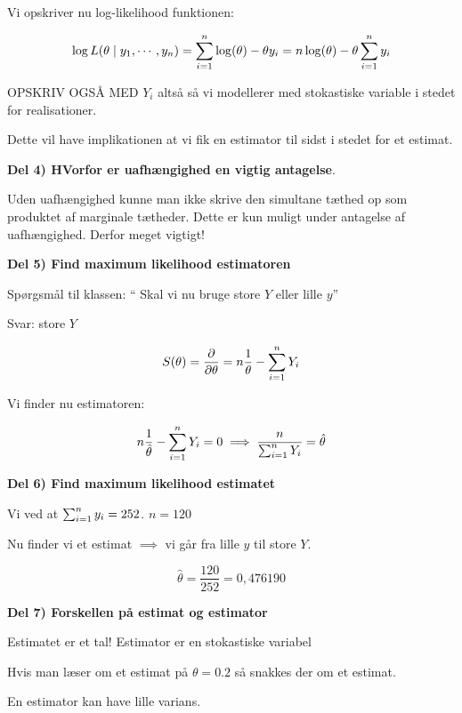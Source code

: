 Vi opskriver nu log-likelihood funktionen:

\begin{equation}
    \log L (\theta \mid y_1, \cdots, y_n) = \sum_{i=1}^{n} \log(\theta) - \theta y_i = n \log(\theta) - \theta \sum_{i=1}^{n} y_i
\end{equation}

OPSKRIV OGSÅ MED $Y_i$ altså så vi modellerer med stokastiske variable i stedet for realisationer.

Dette vil have implikationen at vi fik en estimator til sidst i stedet for et estimat.

\textbf{Del 4) HVorfor er uafhængighed en vigtig antagelse}.

Uden uafhængighed kunne man ikke skrive den simultane tæthed op som produktet af marginale tætheder. Dette er kun muligt under antagelse af uafhængighed. Derfor meget vigtigt!

\textbf{Del 5) Find maximum likelihood estimatoren}

Spørgsmål til klassen: `` Skal vi nu bruge store $Y$ eller lille $y$''

Svar: store $Y$

\begin{equation}
    S(\theta) = \frac{\partial}{\partial \theta} = n \frac{1}{\theta} - \sum_{i=1}^{n} Y_i
\end{equation}

Vi finder nu estimatoren:

\begin{equation}
    n \frac{1}{\hat{\theta}} - \sum_{i=1}^{n} Y_i = 0 \implies \frac{n}{\sum_{i=1}^{n} Y_i}  =  \hat{\theta}
\end{equation}

\textbf{Del 6) Find maximum likelihood estimatet}

Vi ved at $\sum_{i=1}^{n} y_i = 252$. $n=120$

Nu finder vi et estimat $\implies$ vi går fra lille $y$ til store $Y$.

\begin{equation}
    \hat{\theta} = \frac{120}{252} = 0,476190
\end{equation}

\textbf{Del 7) Forskellen på estimat og estimator}

Estimatet er et tal! Estimator er en stokastiske variabel

Hvis man læser om et estimat på $\theta = 0.2$ så snakkes der om et estimat.

En estimator kan have lille varians.

